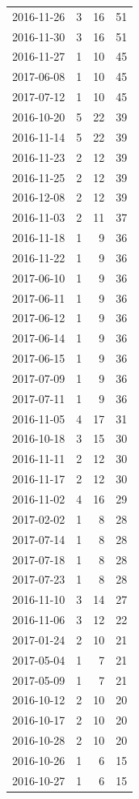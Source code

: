 \begin{tabular}{lrrr}
2016-11-26 & 3 & 16 & 51 \\
2016-11-30 & 3 & 16 & 51 \\
2016-11-27 & 1 & 10 & 45 \\
2017-06-08 & 1 & 10 & 45 \\
2017-07-12 & 1 & 10 & 45 \\
2016-10-20 & 5 & 22 & 39 \\
2016-11-14 & 5 & 22 & 39 \\
2016-11-23 & 2 & 12 & 39 \\
2016-11-25 & 2 & 12 & 39 \\
2016-12-08 & 2 & 12 & 39 \\
2016-11-03 & 2 & 11 & 37 \\
2016-11-18 & 1 & 9 & 36 \\
2016-11-22 & 1 & 9 & 36 \\
2017-06-10 & 1 & 9 & 36 \\
2017-06-11 & 1 & 9 & 36 \\
2017-06-12 & 1 & 9 & 36 \\
2017-06-14 & 1 & 9 & 36 \\
2017-06-15 & 1 & 9 & 36 \\
2017-07-09 & 1 & 9 & 36 \\
2017-07-11 & 1 & 9 & 36 \\
2016-11-05 & 4 & 17 & 31 \\
2016-10-18 & 3 & 15 & 30 \\
2016-11-11 & 2 & 12 & 30 \\
2016-11-17 & 2 & 12 & 30 \\
2016-11-02 & 4 & 16 & 29 \\
2017-02-02 & 1 & 8 & 28 \\
2017-07-14 & 1 & 8 & 28 \\
2017-07-18 & 1 & 8 & 28 \\
2017-07-23 & 1 & 8 & 28 \\
2016-11-10 & 3 & 14 & 27 \\
2016-11-06 & 3 & 12 & 22 \\
2017-01-24 & 2 & 10 & 21 \\
2017-05-04 & 1 & 7 & 21 \\
2017-05-09 & 1 & 7 & 21 \\
2016-10-12 & 2 & 10 & 20 \\
2016-10-17 & 2 & 10 & 20 \\
2016-10-28 & 2 & 10 & 20 \\
2016-10-26 & 1 & 6 & 15 \\
2016-10-27 & 1 & 6 & 15 \\

\end{tabular}
